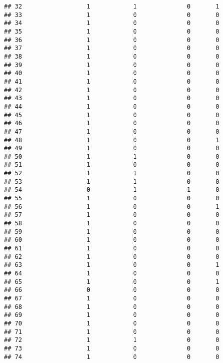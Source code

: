 \documentclass[]{article}
\begin{document}
\begin{verbatim}
## 32                  1            1              0       1
## 33                  1            0              0       0
## 34                  1            0              0       0
## 35                  1            0              0       0
## 36                  1            0              0       0
## 37                  1            0              0       0
## 38                  1            0              0       0
## 39                  1            0              0       0
## 40                  1            0              0       0
## 41                  1            0              0       0
## 42                  1            0              0       0
## 43                  1            0              0       0
## 44                  1            0              0       0
## 45                  1            0              0       0
## 46                  1            0              0       0
## 47                  1            0              0       0
## 48                  1            0              0       1
## 49                  1            0              0       0
## 50                  1            1              0       0
## 51                  1            0              0       0
## 52                  1            1              0       0
## 53                  1            1              0       0
## 54                  0            1              1       0
## 55                  1            0              0       0
## 56                  1            0              0       1
## 57                  1            0              0       0
## 58                  1            0              0       0
## 59                  1            0              0       0
## 60                  1            0              0       0
## 61                  1            0              0       0
## 62                  1            0              0       0
## 63                  1            0              0       1
## 64                  1            0              0       0
## 65                  1            0              0       1
## 66                  0            0              0       0
## 67                  1            0              0       0
## 68                  1            0              0       0
## 69                  1            0              0       0
## 70                  1            0              0       0
## 71                  1            0              0       0
## 72                  1            1              0       0
## 73                  1            0              0       0
## 74                  1            0              0       0

\end{verbatim}
\end{document}
